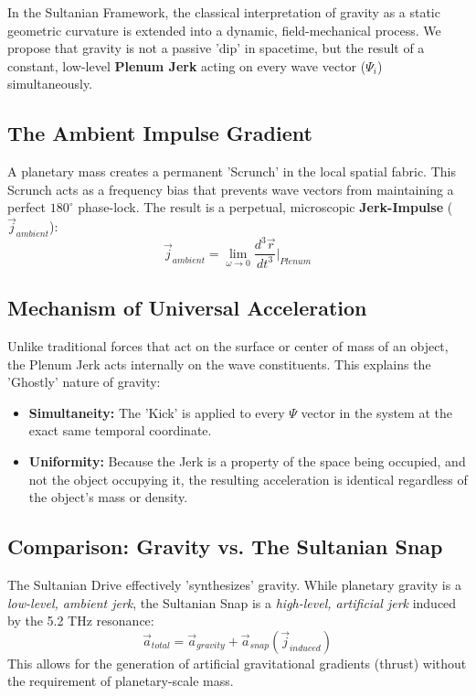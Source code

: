 \documentclass[11pt]{article}
\begin{document}
In the Sultanian Framework, the classical interpretation of gravity as a static geometric curvature is extended into a dynamic, field-mechanical process. We propose that gravity is not a passive 'dip' in spacetime, but the result of a constant, low-level \textbf{Plenum Jerk} acting on every wave vector ($\Psi_i$) simultaneously.

\subsection{The Ambient Impulse Gradient}
A planetary mass creates a permanent 'Scrunch' in the local spatial fabric. This Scrunch acts as a frequency bias that prevents wave vectors from maintaining a perfect $180^\circ$ phase-lock. The result is a perpetual, microscopic \textbf{Jerk-Impulse} ($\vec{j}_{ambient}$):
\begin{equation}
    \vec{j}_{ambient} = \lim_{\omega \to 0} \frac{d^3\vec{r}}{dt^3} \Big|_{Plenum}
\end{equation}

\subsection{Mechanism of Universal Acceleration}
Unlike traditional forces that act on the surface or center of mass of an object, the Plenum Jerk acts internally on the wave constituents. This explains the 'Ghostly' nature of gravity:
\begin{itemize}
    \item \textbf{Simultaneity:} The 'Kick' is applied to every $\Psi$ vector in the system at the exact same temporal coordinate.
    \item \textbf{Uniformity:} Because the Jerk is a property of the space being occupied, and not the object occupying it, the resulting acceleration is identical regardless of the object's mass or density.
\end{itemize}

\subsection{Comparison: Gravity vs. The Sultanian Snap}
The Sultanian Drive effectively 'synthesizes' gravity. While planetary gravity is a \textit{low-level, ambient jerk}, the Sultanian Snap is a \textit{high-level, artificial jerk} induced by the 5.2 THz resonance:
\begin{equation}
    \vec{a}_{total} = \vec{a}_{gravity} + \vec{a}_{snap}(\vec{j}_{induced})
\end{equation}
This allows for the generation of artificial gravitational gradients (thrust) without the requirement of planetary-scale mass.
\end{document}
